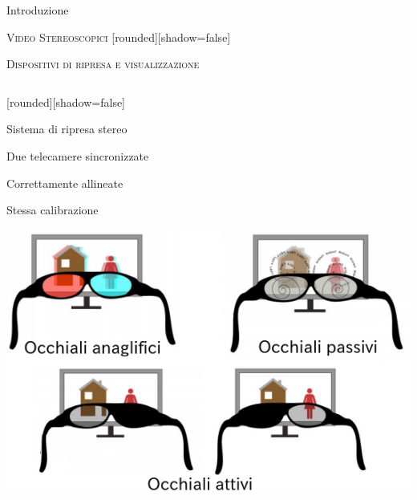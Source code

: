 \documentclass{beamer}
\begin{document}
\begin{section}{Introduzione}
\begin{frame}[t]{\textsc{Video Stereoscopici}}
	[rounded][shadow=false]
		\vspace{-0.5em}
\begin{block}
\end{block} 
	\vspace{0.5em}
\begin{center}
\end{center}
\end{frame}


\begin{frame}[t]{\textsc{Dispositivi di ripresa e visualizzazione}}
\begin{columns}
\begin{column}{5cm}
\begin{center}
[rounded][shadow=false]
\begin{block}{Sistema di ripresa stereo}
		\begin{itemize}
			\item  \small{Due telecamere sincronizzate
			\item Correttamente allineate
			\item Stessa calibrazione}
		\end{itemize}	
	\end{block}
\end{center}
\centering
\includegraphics[width=1\linewidth]{./img/display.png}
\end{column}


\end{columns}
\end{frame}
\end{section}
\end{document}
